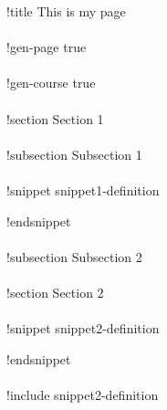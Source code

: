 \documentclass[preview]{standalone}
\begin{document}
!title This is my page
\\\\
!gen-page true
\\\\
!gen-course true
\\\\
!section Section 1
\\\\
!subsection Subsection 1
\\\\
!snippet snippet1-definition


!endsnippet
\\\\
!subsection Subsection 2
\\\\
!section Section 2
\\\\
!snippet snippet2-definition


!endsnippet
\\\\
!include snippet2-definition
\\
\end{document}
